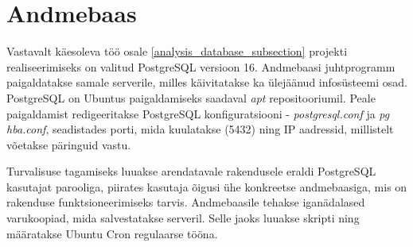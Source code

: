 \section{Andmebaas}
Vastavalt käesoleva töö osale \ref{analysis_database_subsection} projekti realiseerimiseks
on valitud PostgreSQL versioon 16. Andmebaasi juhtprogramm paigaldatakse samale serverile, milles 
käivitatakse ka ülejäänud infosüsteemi osad. PostgreSQL on Ubuntus paigaldamiseks saadaval
\textit{apt} repositooriumil. Peale paigaldamist redigeeritakse PostgreSQL konfiguratsiooni - 
\textit{postgresql.conf} ja \textit{pg hba.conf}, seadistades porti, mida kuulatakse (5432) ning 
IP aadressid, millistelt võetakse päringuid vastu.

Turvalisuse tagamiseks luuakse arendatavale rakendusele eraldi PostgreSQL kasutajat parooliga, 
piirates kasutaja õigusi ühe konkreetse andmebaasiga, mis on rakenduse funktsioneerimiseks tarvis.
Andmebaasile tehakse iganädalased varukoopiad, mida salvestatakse serveril. Selle jaoks luuakse skripti ning 
määratakse Ubuntu Cron regulaarse tööna.



